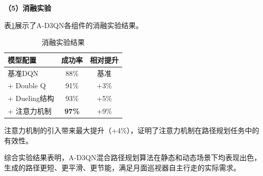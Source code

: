 \textbf{（5）消融实验}

表\ref{tab:ablation}展示了A-D3QN各组件的消融实验结果。

\begin{table}[htbp]
    \centering
    \caption{消融实验结果}
    \label{tab:ablation}
    \begin{tabular}{lcc}
        \toprule
        模型配置 & 成功率 & 相对提升 \\
        \midrule
        基准DQN & 88\% & 基准 \\
        + Double Q & 91\% & +3\% \\
        + Dueling结构 & 93\% & +5\% \\
        + 注意力机制 & \textbf{97\%} & +9\% \\
        \bottomrule
    \end{tabular}
\end{table}

注意力机制的引入带来最大提升（+4\%），证明了注意力机制在路径规划任务中的有效性。

综合实验结果表明，A-D3QN混合路径规划算法在静态和动态场景下均表现出色，生成的路径更短、更平滑、更节能，满足月面巡视器自主行走的实际需求。

